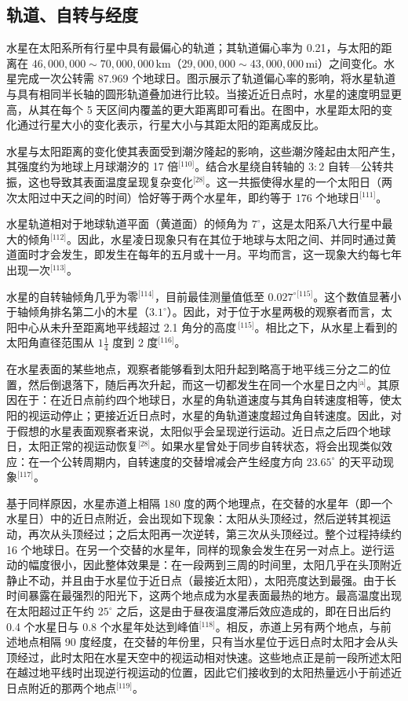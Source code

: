 \subsection{轨道、自转与经度}
水星在太阳系所有行星中具有最偏心的轨道；其轨道偏心率为 0.21，与太阳的距离在 \(46{,}000{,}000\sim70{,}000{,}000\,\mathrm{km}\)（\(29{,}000{,}000\sim43{,}000{,}000\,\mathrm{mi}\)）之间变化。水星完成一次公转需 87.969 个地球日。图示展示了轨道偏心率的影响，将水星轨道与具有相同半长轴的圆形轨道叠加进行比较。当接近近日点时，水星的速度明显更高，从其在每个 5 天区间内覆盖的更大距离即可看出。在图中，水星距太阳的变化通过行星大小的变化表示，行星大小与其距太阳的距离成反比。

水星与太阳距离的变化使其表面受到潮汐隆起的影响，这些潮汐隆起由太阳产生，其强度约为地球上月球潮汐的 17 倍\(^\text{[110]}\)。结合水星绕自转轴的 \(3:2\) 自转—公转共振，这也导致其表面温度呈现复杂变化\(^\text{[28]}\)。这一共振使得水星的一个太阳日（两次太阳过中天之间的时间）恰好等于两个水星年，即约等于 176 个地球日\(^\text{[111]}\)。

水星轨道相对于地球轨道平面（黄道面）的倾角为 \(7^{\circ}\)，这是太阳系八大行星中最大的倾角\(^\text{[112]}\)。因此，水星凌日现象只有在其位于地球与太阳之间、并同时通过黄道面时才会发生，即发生在每年的五月或十一月。平均而言，这一现象大约每七年出现一次\(^\text{[113]}\)。

水星的自转轴倾角几乎为零\(^\text{[114]}\)，目前最佳测量值低至 \(0.027^{\circ}\)\(^\text{[115]}\)。这个数值显著小于轴倾角排名第二小的木星（\(3.1^{\circ}\)）。因此，对于位于水星两极的观察者而言，太阳中心从未升至距离地平线超过 2.1 角分的高度\,\(^\text{[115]}\)。相比之下，从水星上看到的太阳角直径范围从 \(1\tfrac{1}{4}\) 度到 2 度\(^\text{[116]}\)。

在水星表面的某些地点，观察者能够看到太阳升起到略高于地平线三分之二的位置，然后倒退落下，随后再次升起，而这一切都发生在同一个水星日之内\(^\text{[a]}\)。其原因在于：在近日点前约四个地球日，水星的角轨道速度与其角自转速度相等，使太阳的视运动停止；更接近近日点时，水星的角轨道速度超过角自转速度。因此，对于假想的水星表面观察者来说，太阳似乎会呈现逆行运动。近日点之后四个地球日，太阳正常的视运动恢复\(^\text{[28]}\)。如果水星曾处于同步自转状态，将会出现类似效应：在一个公转周期内，自转速度的交替增减会产生经度方向 \(23.65^{\circ}\) 的天平动现象\(^\text{[117]}\)。

基于同样原因，水星赤道上相隔 180 度的两个地理点，在交替的水星年（即一个水星日）中的近日点附近，会出现如下现象：太阳从头顶经过，然后逆转其视运动，再次从头顶经过；之后太阳再一次逆转，第三次从头顶经过。整个过程持续约 16 个地球日。在另一个交替的水星年，同样的现象会发生在另一对点上。逆行运动的幅度很小，因此整体效果是：在一段两到三周的时间里，太阳几乎在头顶附近静止不动，并且由于水星位于近日点（最接近太阳），太阳亮度达到最强。由于长时间暴露在最强烈的阳光下，这两个地点成为水星表面最热的地方。最高温度出现在太阳超过正午约 \(25^{\circ}\) 之后，这是由于昼夜温度滞后效应造成的，即在日出后约 0.4 个水星日与 0.8 个水星年处达到峰值\(^\text{[118]}\)。相反，赤道上另有两个地点，与前述地点相隔 90 度经度，在交替的年份里，只有当水星位于远日点时太阳才会从头顶经过，此时太阳在水星天空中的视运动相对快速。这些地点正是前一段所述太阳在越过地平线时出现逆行视运动的位置，因此它们接收到的太阳热量远小于前述近日点附近的那两个地点\(^\text{[119]}\)。

